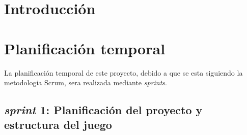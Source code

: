 
\section{Introducción}

\section{Planificación temporal}
La planificación temporal de este proyecto, debido a que se esta siguiendo la metodologia Scrum, sera realizada mediante \textit{sprints}.

\subsection{\textbf{\textit{sprint} 1: Planificación del proyecto y estructura del juego}}
